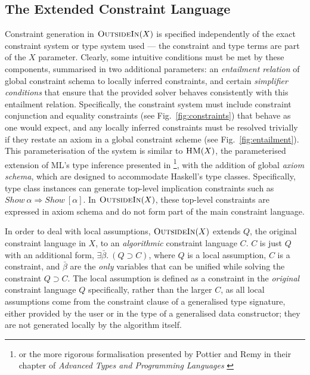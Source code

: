 \documentclass[a4paper]{jfp}
\newcommand{\outsidein}{\textsc{OutsideIn}(X)}
\begin{document}
\subsection{The Extended Constraint Language}

Constraint generation in $\outsidein$ is specified independently of the exact constraint system or type system used --- the constraint and type terms
are part of the $X$ parameter. Clearly, some intuitive conditions must be met by these components, summarised in two additional parameters: an
\emph{entailment relation} of global constraint schema to locally inferred constraints, and certain \emph{simplifier conditions} that ensure that the
provided solver behaves consistently with this entailment relation. Specifically, the constraint system must include constraint conjunction and
equality constraints (see Fig.~\ref{fig:constraints}) that behave as one would expect, and any locally inferred constraints must be resolved trivially
if they restate an axiom in a global constraint scheme (see Fig.~\ref{fig:entailment}). This parameterisation of the system is similar to
$\textsc{HM}(X)$, the parameterised extension of ML's type inference presented in \cite{Odersky97typeinference}\footnote{or the more rigorous
   formalisation presented by Pottier and Remy in their chapter of \emph{Advanced Types and Programming Languages} \cite{Pottier:2005ue}}, with the
addition of global \emph{axiom schema}, which are designed to accommodate Haskell's type classes. Specifically, type class instances can generate
top-level implication constraints such as $\mathit{Show}\ \alpha \Rightarrow \mathit{Show}\ [\alpha]$. In $\outsidein$, these top-level constraints
are expressed in axiom schema and do not form part of the main constraint language. 

In order to deal with local assumptions, $\outsidein$ extends $Q$, the original constraint language in $X$, to an \emph{algorithmic} constraint
language $C$.  $C$ is just $Q$ with an additional form, $\exists\bar{\beta}.\ (Q \supset C)$, where $Q$ is a local assumption, $C$ is a constraint,
and $\bar{\beta}$ are the \emph{only} variables that can be unified while solving the constraint $Q \supset C$. The local assumption is defined as a
constraint in the \emph{original} constraint language $Q$ specifically, rather than the larger $C$, as all local assumptions come from the constraint
clause of a generalised type signature, either provided by the user or in the type of a generalised data constructor; they are not generated locally
by the algorithm itself.
\end{document}
